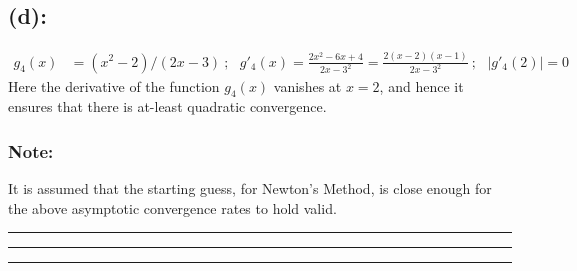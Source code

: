 \subsection*{(d): }
\begin{align*}
g_4(x) & = (x^2-2)/(2x-3)\ ; \ \ \ g'_4(x) = \frac{2x^2-6x+4}{{2x-3}^2} = \frac{2 (x-2)(x-1)}{{2x-3}^2}\ ; \ \ \ |g'_4(2)| = 0 
\end{align*}
Here the derivative of the function $g_4(x)$ vanishes at $x=2$, and hence  it ensures that there is at-least quadratic convergence. 
\subsubsection*{Note: }
It is assumed that the starting guess, for Newton's Method, is close enough for the above asymptotic convergence rates to hold valid. \\
\hrule \hrule \hrule
